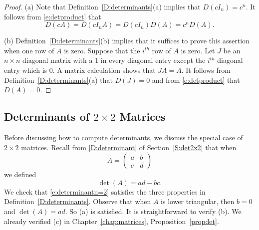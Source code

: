 \documentclass{ximera}
\begin{document}
\begin{proof}  (a) Note that Definition~\ref{D:determinants}(a) implies that 
$D(cI_n)=c^n$.  It follows from \eqref{e:detproduct} that
\[
D(cA) = D(cI_n A) = D(cI_n)D(A) = c^n D(A).
\]

(b)  Definition~\ref{D:determinants}(b) implies that it suffices to prove 
this assertion when one row of $A$ is zero.  Suppose that the $i^{th}$ row 
of $A$ is zero.  Let $J$ be an $n\times n$ 
diagonal matrix with a $1$ in every diagonal entry except the $i^{th}$ 
diagonal entry which is $0$.  A matrix calculation shows that $JA=A$. 
It follows from Definition~\ref{D:determinants}(a) that $D(J)=0$ and 
from \eqref{e:detproduct} that $D(A)=0$.  
\end{proof} 



\subsection*{Determinants of $2\times 2$ Matrices}
 
Before discussing how to compute determinants, we discuss the
special case of $2\times 2$ matrices.  Recall from \eqref{D:determinant} of 
Section~\ref{S:det2x2} that when 
\[
A=\left(\begin{array}{cc} a & b\\c & d \end{array}\right)
\]
we defined 
\begin{equation}  \label{e:determinantn=2}
\det(A)=ad-bc.
\end{equation}
We check that \eqref{e:determinantn=2} satisfies the three
properties in Definition~\ref{D:determinants}.  Observe that when
$A$ is lower triangular, then $b=0$ and $\det(A)=ad$.  So (a) is
satisfied.  It is straightforward to verify (b).  We already
verified (c) in Chapter~\ref{chap:matrices}, Proposition~\ref{propdet}.
\end{document}
